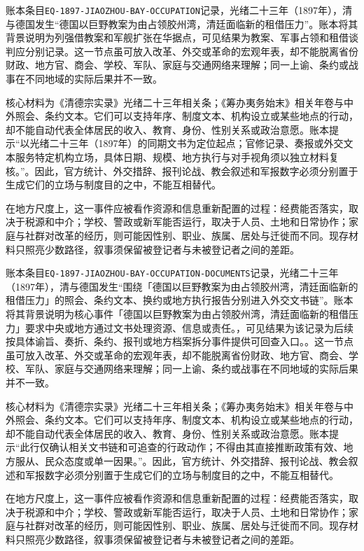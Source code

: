 账本条目\texttt{EQ-1897-JIAOZHOU-BAY-OCCUPATION}记录，光绪二十三年（1897年），清与德国发生“德国以巨野教案为由占领胶州湾，清廷面临新的租借压力”。账本将其背景说明为列强借教案和军舰扩张在华据点，可见结果为教案、军事占领和租借谈判应分别记录。这一节点虽可放入改革、外交或革命的宏观年表，却不能脱离省份财政、地方官、商会、学校、军队、家庭与交通网络来理解；同一上谕、条约或战事在不同地域的实际后果并不一致。

核心材料为《清德宗实录》光绪二十三年相关条；《筹办夷务始末》相关年卷与中外照会、条约文本。它们可以支持年序、制度文本、机构设立或某些地点的行动，却不能自动代表全体居民的收入、教育、身份、性别关系或政治意愿。账本提示“以光绪二十三年（1897年）的同期文书为定位起点；官修记录、奏报或外交文本服务特定机构立场，具体日期、规模、地方执行与对手视角须以独立材料复核。”。因此，官方统计、外交措辞、报刊论战、教会叙述和军报数字必须分别置于生成它们的立场与制度目的之中，不能互相替代。

在地方尺度上，这一事件应被看作资源和信息重新配置的过程：经费能否落实，取决于税源和中介；学校、警政或新军能否运行，取决于人员、土地和日常协作；家庭与社群对改革的经历，则可能因性别、职业、族属、居处与迁徙而不同。现存材料只照亮少数路径，叙事须保留被登记者与未被登记者之间的差距。

账本条目\texttt{EQ-1897-JIAOZHOU-BAY-OCCUPATION-DOCUMENTS}记录，光绪二十三年（1897年），清与德国发生“围绕「德国以巨野教案为由占领胶州湾，清廷面临新的租借压力」的照会、条约文本、换约或地方执行报告分别进入外交文书链”。账本将其背景说明为核心事件「德国以巨野教案为由占领胶州湾，清廷面临新的租借压力」要求中央或地方通过文书处理资源、信息或责任。，可见结果为该记录为后续按具体谕旨、奏折、条约、报刊或地方档案拆分事件提供可回查入口。。这一节点虽可放入改革、外交或革命的宏观年表，却不能脱离省份财政、地方官、商会、学校、军队、家庭与交通网络来理解；同一上谕、条约或战事在不同地域的实际后果并不一致。

核心材料为《清德宗实录》光绪二十三年相关条；《筹办夷务始末》相关年卷与中外照会、条约文本。它们可以支持年序、制度文本、机构设立或某些地点的行动，却不能自动代表全体居民的收入、教育、身份、性别关系或政治意愿。账本提示“此行仅确认相关文书链和可追查的行政动作；不得由其直接推断政策有效、地方服从、民众态度或单一因果。”。因此，官方统计、外交措辞、报刊论战、教会叙述和军报数字必须分别置于生成它们的立场与制度目的之中，不能互相替代。

在地方尺度上，这一事件应被看作资源和信息重新配置的过程：经费能否落实，取决于税源和中介；学校、警政或新军能否运行，取决于人员、土地和日常协作；家庭与社群对改革的经历，则可能因性别、职业、族属、居处与迁徙而不同。现存材料只照亮少数路径，叙事须保留被登记者与未被登记者之间的差距。

